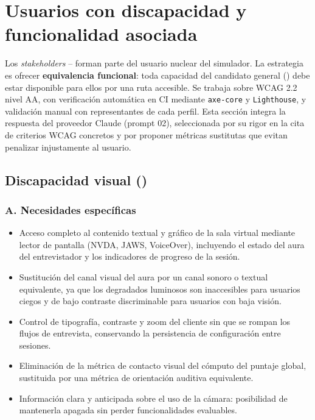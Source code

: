 \section{Usuarios con discapacidad y funcionalidad asociada}
\label{sec:discapacidad}

Los \textit{stakeholders} -- forman parte del usuario nuclear
del simulador. La estrategia es ofrecer \textbf{equivalencia funcional}:
toda capacidad del candidato general () debe estar disponible para
ellos por una ruta accesible. Se trabaja sobre WCAG 2.2 nivel AA, con
verificación automática en CI mediante \texttt{axe-core} y
\texttt{Lighthouse}, y validación manual con representantes de cada
perfil. Esta sección integra la respuesta del proveedor Claude
(prompt 02), seleccionada por su rigor en la cita de criterios WCAG
concretos y por proponer métricas sustitutas que evitan penalizar
injustamente al usuario.

\subsection{Discapacidad visual ()}

\subsubsection*{A. Necesidades específicas}
\begin{itemize}
  \item Acceso completo al contenido textual y gráfico de la sala
        virtual mediante lector de pantalla (NVDA, JAWS, VoiceOver),
        incluyendo el estado del aura del entrevistador y los
        indicadores de progreso de la sesión.
  \item Sustitución del canal visual del aura por un canal sonoro o
        textual equivalente, ya que los degradados luminosos son
        inaccesibles para usuarios ciegos y de bajo contraste
        discriminable para usuarios con baja visión.
  \item Control de tipografía, contraste y zoom del cliente sin que se
        rompan los flujos de entrevista, conservando la persistencia
        de configuración entre sesiones.
  \item Eliminación de la métrica de contacto visual del cómputo del
        puntaje global, sustituida por una métrica de orientación
        auditiva equivalente.
  \item Información clara y anticipada sobre el uso de la cámara:
        posibilidad de mantenerla apagada sin perder funcionalidades
        evaluables.
\end{itemize}

